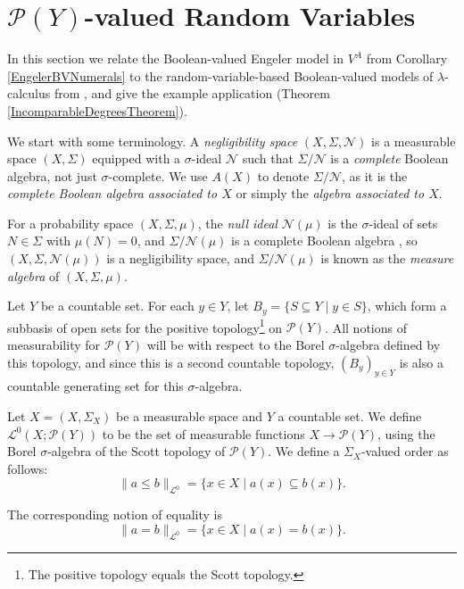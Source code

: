 \documentclass{lmcs}
\newcommand{\Ell}{\mathcal{L}}
\newcommand{\En}{\mathcal{N}}
\newcommand{\powerset}{\ensuremath{\mathcal{P}}}
\begin{document}


\section{$\powerset(Y)$-valued Random Variables}
\label{RandomVariablesSection}
In this section we relate the Boolean-valued Engeler model in $V^A$ from Corollary \ref{EngelerBVNumerals} to the random-variable-based Boolean-valued models of $\lambda$-calculus from \cite{Bacci18b}, and give the example application (Theorem \ref{IncomparableDegreesTheorem}). 

We start with some terminology. A \emph{negligibility space} $(X,\Sigma,\En)$ is a measurable space $(X,\Sigma)$ equipped with a $\sigma$-ideal $\En$ such that $\Sigma/\En$ is a \emph{complete} Boolean algebra, not just $\sigma$-complete. We use $A(X)$ to denote $\Sigma/\En$, as it is the \emph{complete Boolean algebra associated to $X$} or simply the \emph{algebra associated to $X$}. 

For a probability space $(X,\Sigma,\mu)$, the \textit{null ideal} $\En(\mu)$ is the $\sigma$-ideal of sets $N \in \Sigma$ with $\mu(N) = 0$, and $\Sigma/\En(\mu)$ is a complete Boolean algebra \cite[322B,322C]{fremlin3}, so $(X,\Sigma,\En(\mu))$ is a negligibility space, and $\Sigma/\En(\mu)$ is known as the \emph{measure algebra} of $(X,\Sigma,\mu)$. 

Let $Y$ be a countable set. For each $y \in Y$, let $B_y = \{ S \subseteq Y \mid y \in S \}$, which form a subbasis of open sets for the positive topology\footnote{The positive topology equals the Scott topology.} on $\powerset(Y)$. All notions of measurability for $\powerset(Y)$ will be with respect to the Borel $\sigma$-algebra defined by this topology, and since this is a second countable topology, $(B_y)_{y \in Y}$ is also a countable generating set for this $\sigma$-algebra. 

\begin{defi}
	\label{LNoughtPosetDef}
	Let $X = (X,\Sigma_X)$ be a measurable space and $Y$ a countable set. We define $\Ell^0(X;\powerset(Y))$ to be the set of measurable functions $X \rightarrow \powerset(Y)$, using the Borel $\sigma$-algebra of the Scott topology of $\powerset(Y)$. We define a $\Sigma_X$-valued order as follows:
	\[
	\| a \leq b \|_{\Ell^0} = \{ x \in X \mid a(x) \subseteq b(x) \}.
	\]
	
	The corresponding notion of equality is
	\[
	\| a = b \|_{\Ell^0} = \{ x \in X \mid a(x) = b(x) \}.
	\]
\end{defi}
\end{document}

